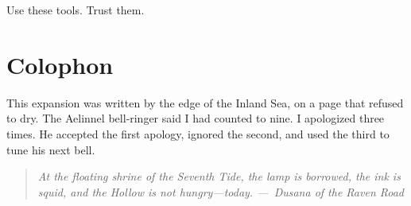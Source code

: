 \documentclass[12pt]{book}
\newcommand{\dusana}[1]{%
    \begin{quote}\itshape #1 ---~Dusana of the Raven Road\end{quote}}
\begin{document}
Use these tools. Trust them.

\chapter{Colophon}
This expansion was written by the edge of the Inland Sea, on a page that refused to dry. The Aelinnel bell‑ringer said I had counted to nine. I apologized three times. He accepted the first apology, ignored the second, and used the third to tune his next bell.

\vspace{1em}
\dusana{At the floating shrine of the Seventh Tide, the lamp is borrowed, the ink is squid, and the Hollow is not hungry---today.}
\end{document}
